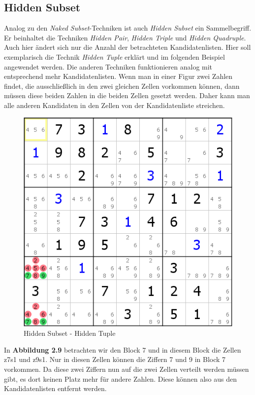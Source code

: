 \newpage
\subsection{Hidden Subset}
\label{Hidden Subset}
Analog zu den \textit{Naked Subset}-Techniken ist auch \textit{Hidden Subset} ein Sammelbegriff. Er beinhaltet die Techniken \textit{Hidden Pair}, \textit{Hidden Triple} und \textit{Hidden Quadruple}. Auch hier ändert sich nur die Anzahl der betrachteten Kandidatenlisten. Hier soll exemplarisch die Technik \textit{Hidden Tuple} erklärt und im folgenden Beispiel angewendet werden. Die anderen Techniken funktionieren analog mit entsprechend mehr Kandidatenlisten.
Wenn man in einer Figur zwei Zahlen findet, die ausschließlich in den zwei gleichen Zellen vorkommen können, dann müssen diese beiden Zahlen in die beiden Zellen gesetzt werden. Daher kann man alle anderen Kandidaten in den Zellen von der Kandidatenliste streichen.

\begin{figure}[h]
\begin{center}
\includegraphics{./img/hidden_subset.png}
\caption{Hidden Subset - Hidden Tuple}
\end{center}
\end{figure}

\noindent In \textbf{Abbildung 2.9} betrachten wir den Block 7 und in diesem Block die Zellen z7s1 und z9s1. Nur in diesen Zellen können die Ziffern 7 und 9 in Block 7 vorkommen. Da diese zwei Ziffern nun auf die zwei Zellen verteilt werden müssen gibt, es dort keinen Platz mehr für andere Zahlen. Diese können also aus den Kandidatenlisten entfernt werden.
